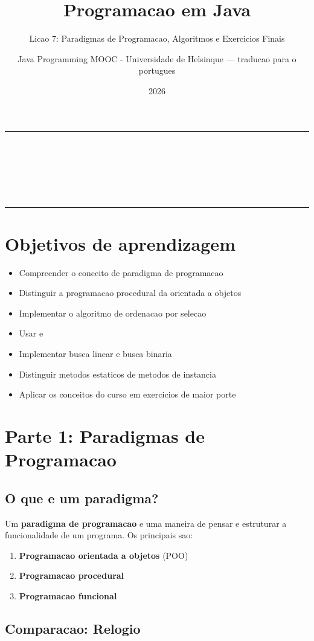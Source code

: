 \documentclass[11pt,a4paper]{article}
\title{Programacao em Java}
\subtitle{Licao 7: Paradigmas de Programacao, Algoritmos e Exercicios Finais}
\author{Java Programming MOOC - Universidade de Helsinque --- traducao para o portugues}
\date{2026}
\makeatletter
\renewcommand{\maketitle}{%
  \begin{center}
    {\color{javaRule}\rule{\linewidth}{1pt}}\\[6pt]
    {\Huge\sffamily\bfseries\color{javaOrange} \@title}\\[6pt]
    \ifx\@subtitle\undefined\else
      {\Large\sffamily\color{javaDeep} \@subtitle}\\[4pt]
    \fi
    {\small\sffamily\color{gray} \@author}\\[2pt]
    {\small\sffamily\color{gray} \@date}\\[6pt]
    {\color{javaRule}\rule{\linewidth}{1pt}}
  \end{center}
  \vspace{1em}
}
\makeatother
\begin{document}
\maketitle
\tableofcontents
\vspace{1.5em}

\section{Objetivos de aprendizagem}

\begin{itemize}
  \item Compreender o conceito de paradigma de programacao
  \item Distinguir a programacao procedural da orientada a objetos
  \item Implementar o algoritmo de ordenacao por selecao
  \item Usar  e 
  \item Implementar busca linear e busca binaria
  \item Distinguir metodos estaticos de metodos de instancia
  \item Aplicar os conceitos do curso em exercicios de maior porte
\end{itemize}

\section{Parte 1: Paradigmas de Programacao}

\subsection{O que e um paradigma?}

Um \textbf{paradigma de programacao} e uma maneira de pensar e estruturar a funcionalidade de um programa. Os principais sao:
\begin{enumerate}
  \item \textbf{Programacao orientada a objetos} (POO)
  \item \textbf{Programacao procedural}
  \item \textbf{Programacao funcional}
\end{enumerate}

\subsection{Comparacao: Relogio}
\end{document}

